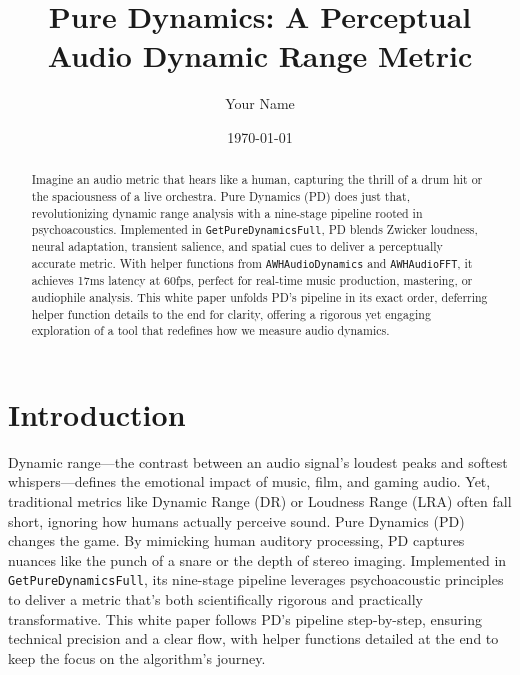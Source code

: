 \documentclass[11pt]{article}
\title{Pure Dynamics: A Perceptual Audio Dynamic Range Metric}
\author{Your Name}
\date{\today}
\begin{document}
\maketitle

\begin{abstract}
Imagine an audio metric that hears like a human, capturing the thrill of a drum hit or the spaciousness of a live orchestra. Pure Dynamics (PD) does just that, revolutionizing dynamic range analysis with a nine-stage pipeline rooted in psychoacoustics. Implemented in \texttt{GetPureDynamicsFull}, PD blends Zwicker loudness, neural adaptation, transient salience, and spatial cues to deliver a perceptually accurate metric. With helper functions from \texttt{AWHAudioDynamics} and \texttt{AWHAudioFFT}, it achieves 17ms latency at 60fps, perfect for real-time music production, mastering, or audiophile analysis. This white paper unfolds PD’s pipeline in its exact order, deferring helper function details to the end for clarity, offering a rigorous yet engaging exploration of a tool that redefines how we measure audio dynamics.
\end{abstract}

\section{Introduction}
Dynamic range—the contrast between an audio signal’s loudest peaks and softest whispers—defines the emotional impact of music, film, and gaming audio. Yet, traditional metrics like Dynamic Range (DR) or Loudness Range (LRA) often fall short, ignoring how humans actually perceive sound. Pure Dynamics (PD) changes the game. By mimicking human auditory processing, PD captures nuances like the punch of a snare or the depth of stereo imaging. Implemented in \texttt{GetPureDynamicsFull}, its nine-stage pipeline leverages psychoacoustic principles to deliver a metric that’s both scientifically rigorous and practically transformative. This white paper follows PD’s pipeline step-by-step, ensuring technical precision and a clear flow, with helper functions detailed at the end to keep the focus on the algorithm’s journey.

\end{document}
